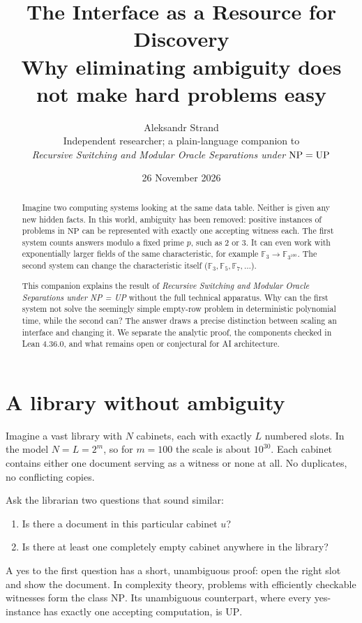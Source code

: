 \documentclass[11pt,a4paper]{article}
\title{\textbf{The Interface as a Resource for Discovery}\\[5pt]\large Why eliminating ambiguity does not make hard problems easy}
\author{Aleksandr Strand\\
\small Independent researcher; a plain-language companion to\\
\small\textit{Recursive Switching and Modular Oracle Separations under $\NP=\UP$}}
\date{26 November 2026}
\newcommand{\F}{\mathbb F}
\newcommand{\NP}{\mathrm{NP}}
\newcommand{\UP}{\mathrm{UP}}
\begin{document}
\maketitle
\begin{abstract}
Imagine two computing systems looking at the same data table. Neither is given any new hidden facts. In this world, ambiguity has been removed: positive instances of problems in \(\NP\) can be represented with exactly one accepting witness each. The first system counts answers modulo a fixed prime \(p\), such as 2 or 3. It can even work with exponentially larger fields of the same characteristic, for example \(\F_3\to\F_{3^{100}}\). The second system can change the characteristic itself (\(\F_3,\F_5,\F_7,\ldots\)).

This companion explains the result of \textit{Recursive Switching and Modular Oracle Separations under NP = UP} without the full technical apparatus. Why can the first system not solve the seemingly simple empty-row problem in deterministic polynomial time, while the second can? The answer draws a precise distinction between scaling an interface and changing it. We separate the analytic proof, the components checked in Lean 4.36.0, and what remains open or conjectural for AI architecture.
\end{abstract}

\section{A library without ambiguity}
Imagine a vast library with \(N\) cabinets, each with exactly \(L\) numbered slots. In the model \(N=L=2^m\), so for \(m=100\) the scale is about \(10^{30}\). Each cabinet contains either one document serving as a witness or none at all. No duplicates, no conflicting copies.

Ask the librarian two questions that sound similar:
\begin{enumerate}
\item Is there a document in this particular cabinet \(u\)?
\item Is there at least one completely empty cabinet anywhere in the library?
\end{enumerate}
A yes to the first question has a short, unambiguous proof: open the right slot and show the document. In complexity theory, problems with efficiently checkable witnesses form the class \(\NP\). Its unambiguous counterpart, where every yes-instance has exactly one accepting computation, is \(\UP\).
\end{document}
